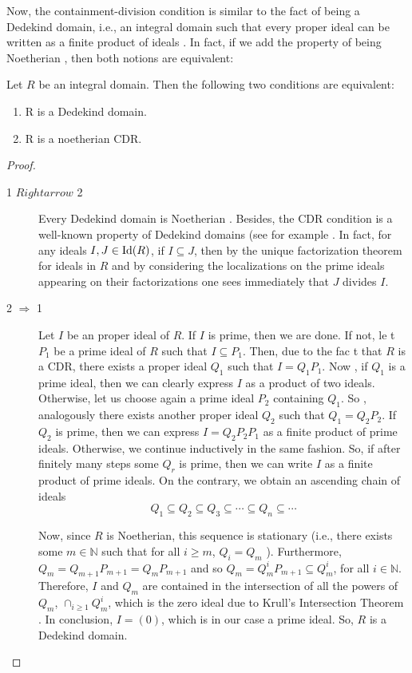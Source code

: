 Now, the containment-division condition is similar to the fact of being a Dedekind domain, i.e., an integral domain such that every proper ideal can be written as a finite product of ideals \cite[Theorem 37.1 and 37.8]{colemanmultidealtheory}. In fact, if we add the property of being Noetherian \cite{eisenbud}, then both notions are equivalent:

\begin{theorem}\label{CDRDedekind}
Let $R$ be an integral domain. Then the following two conditions are equivalent:
\begin{enumerate}
\item R is a Dedekind domain.
\item R is a noetherian CDR.
\end{enumerate}
\end{theorem}
\begin{proof}
  \begin{description}
  \item[1 $Rightarrow$ 2]  Every Dedekind domain is Noetherian \cite[Theorem 37.1]{colemanmultidealtheory}. Besides, the CDR condition is a well-known property of Dedekind domains (see for example \cite[Fundamental Theorem of OAK-s]{weissalgebraicnumber}. In fact, for any ideals $I,J \in {\rm Id}(R)$, if $I \subseteq J$, then by the unique factorization theorem for ideals in $R$ \cite[Theorem 37.11]{colemanmultidealtheory} and by considering the localizations on the prime ideals appearing on their factorizations one sees immediately that $J$ divides $I$.
  \item[2 $\Rightarrow$ 1] 
Let $I$ be an proper ideal of $R$. If $I$ is prime, then we are done. If not, le
t $P_1$ be a prime ideal of $R$ such that $I\subseteq P_1$. Then, due to the fac
t that $R$ is a CDR, there exists a proper ideal $Q_1$ such that $I=Q_1P_1$. Now
, if $Q_1$ is a prime ideal, then we can clearly express $I$ as a product of two
 ideals. Otherwise, let us choose again a prime ideal $P_2$ containing $Q_1$. So
, analogously there exists another proper ideal $Q_2$ such that $Q_1=Q_2P_2$. If $Q_2$ is prime, then we can express $I= Q_2P_2P_1$ as a finite product of prime ideals. Otherwise, we continue inductively in the same fashion. So, if after finitely many steps some $Q_r$ is prime, then we can write $I$ as a finite product of prime ideals. On the contrary, we obtain an ascending chain of ideals 
\[Q_1\subseteq Q_2 \subseteq Q_3\subseteq \cdots \subseteq Q_n \subseteq \cdots\]

Now, since $R$ is Noetherian, this sequence is stationary (i.e., there exists some $m\in \mathbb{N}$ such that for all $i\geq m$, $Q_i=Q_m$ \cite[Proposition 6.2]{atimac}). Furthermore, $Q_m=Q_{m+1}P_{m+1}=Q_mP_{m+1}$ and so $Q_m=Q_m^iP_{m+1}\subseteq Q_m^i$, for all $i \in \mathbb{N}$. Therefore, $I$ and $Q_m$ are contained in the intersection of all the powers of $Q_m$, $\cap_{i\geq 1}Q_m^i$, which is the zero ideal due to Krull's Intersection Theorem \cite[Corollary 5.4]{eisenbud}. In conclusion, $I=(0)$, which is in our case a prime ideal. So, $R$ is a Dedekind domain.

  \end{description}
\end{proof}


